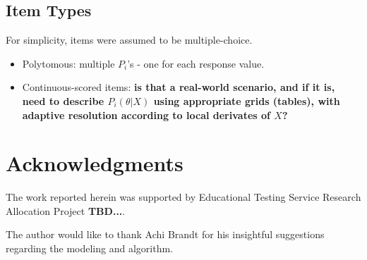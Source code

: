 \documentclass{article}
\newcommand{\ta}{\theta}
\begin{document}
\subsection{Item Types}
For simplicity, items were assumed to be multiple-choice.
\begin{itemize}
	\item Polytomous: multiple $P_i$'s - one for each response value.
	\item Continuous-scored items: {\bf is that a real-world scenario, and if it is, 
	need to describe $P_i(\ta|X)$ using appropriate grids (tables), with adaptive resolution
	according to local derivates of $X$?}
\end{itemize}

\section{Acknowledgments}
The work reported herein was supported by Educational Testing Service Research Allocation Project {\bf TBD...}.

The author would like to thank Achi Brandt for his insightful suggestions regarding the modeling and algorithm.



\end{document}
